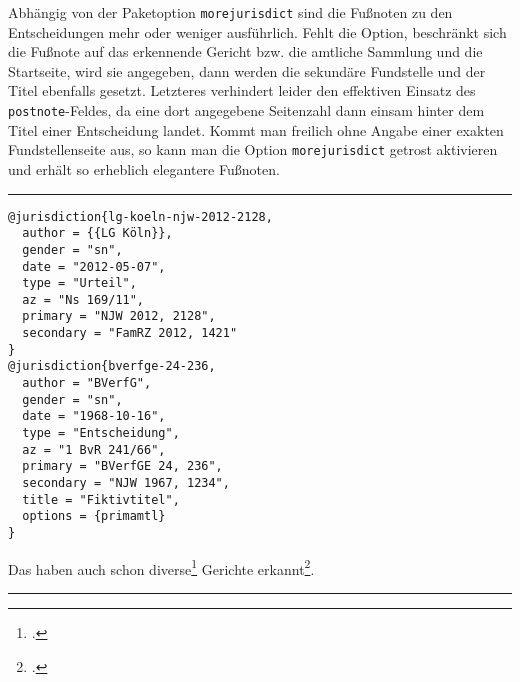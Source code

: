 \documentclass[11pt,a4paper,DIV=calc]{scrartcl}
\newenvironment{rubexample}{\par\vspace{\baselineskip}\hrule\par\begin{refsection}}{\end{refsection}\par\hrule\par\vspace{\baselineskip}}
\begin{document}
Abhängig von der Paketoption \verb+morejurisdict+ sind die Fußnoten zu
den Entscheidungen mehr oder weniger ausführlich. Fehlt die Option,
beschränkt sich die Fußnote auf das erkennende Gericht bzw. die
amtliche Sammlung und die Startseite, wird sie angegeben, dann werden
die sekundäre Fundstelle und der Titel ebenfalls gesetzt. Letzteres
verhindert leider den effektiven Einsatz des \verb+postnote+-Feldes,
da eine dort angegebene Seitenzahl dann einsam hinter dem Titel einer
Entscheidung landet. Kommt man freilich ohne Angabe einer exakten
Fundstellenseite aus, so kann man die Option \verb+morejurisdict+
getrost aktivieren und erhält so erheblich elegantere Fußnoten.

\begin{rubexample}
\begin{verbatim}
@jurisdiction{lg-koeln-njw-2012-2128,
  author = {{LG Köln}},
  gender = "sn",
  date = "2012-05-07",
  type = "Urteil",
  az = "Ns 169/11",
  primary = "NJW 2012, 2128",
  secondary = "FamRZ 2012, 1421"
}
@jurisdiction{bverfge-24-236,
  author = "BVerfG",
  gender = "sn",
  date = "1968-10-16",
  type = "Entscheidung",
  az = "1 BvR 241/66",
  primary = "BVerfGE 24, 236",
  secondary = "NJW 1967, 1234",
  title = "Fiktivtitel",
  options = {primamtl}
}
\end{verbatim}

Das haben auch schon diverse\footcite[2129]{lg-koeln-njw-2012-2128}
Gerichte erkannt\footcite{bverfge-24-236}.

\printbibliography
\end{rubexample}
\end{document}
